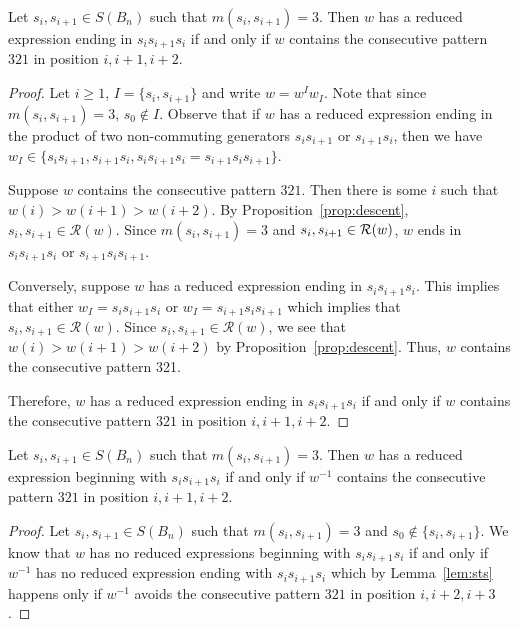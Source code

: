\begin{lemma}\label{lem:sts}
Let $s_i,s_{i+1} \in S(B_n)$ such that $m(s_i,s_{i+1})=3$. Then $w$ has a reduced expression ending in $s_is_{i+1}s_i$ if and only if $w$ contains the consecutive pattern $321$ in position $i, i+1, i+2$.
\begin{proof}
	Let $i \geq 1$, $I=\{s_i,s_{i+1}\}$ and write $w=w^Iw_I$. Note that since $m(s_i,s_{i+1})=3$, $s_0 \notin I$. Observe that if $w$ has a reduced expression ending in the product of two non-commuting generators $s_is_{i+1}$ or $s_{i+1}s_i$, then we have $w_I \in \{s_is_{i+1}, s_{i+1}s_i, s_is_{i+1}s_i=s_{i+1}s_is_{i+1}\}$.
	
	Suppose $w$ contains the consecutive pattern $321$. Then there is some $i$ such that $w(i) > w(i+1) > w(i+2)$. By Proposition~\ref{prop:descent}, $s_i,s_{i+1} \in \mathcal{R}(w)$. Since $m(s_i,s_{i+1})=3$ and $s_i, s_{i+1} \in \mathcal{R}(w)$, $w$ ends in $s_is_{i+1}s_{i}$ or $s_{i+1}s_is_{i+1}$.
	
	Conversely, suppose $w$ has a reduced expression ending in $s_is_{i+1}s_i$. This implies that either $w_I=s_is_{i+1}s_i$ or $w_I=s_{i+1}s_is_{i+1}$ which implies that $s_i,s_{i+1} \in \mathcal{R}(w)$. Since $s_i,s_{i+1} \in \mathcal{R}(w)$, we see that $w(i)>w(i+1)>w(i+2)$ by Proposition~\ref{prop:descent}. Thus, $w$ contains the consecutive pattern 321.
	
	Therefore, $w$ has a reduced expression ending in $s_is_{i+1}s_i$ if and only if $w$ contains the consecutive pattern $321$ in position $i, i+1, i+2$. 
\end{proof}	
\end{lemma}

\begin{corollary}\label{lem:endswithsts}
	Let $s_i,s_{i+1} \in S(B_n)$ such that $m(s_i,s_{i+1})=3$. Then $w$ has a reduced expression beginning with $s_is_{i+1}s_i$ if and only if $w^{-1}$ contains the consecutive pattern $321$ in position $i, i+1, i+2$.
	\begin{proof}
		Let $s_i,s_{i+1} \in S(B_n)$ such that $m(s_i,s_{i+1})=3$ and $s_0 \notin\{s_i,s_{i+1}\}$. We know that $w$ has no reduced expressions beginning with $s_is_{i+1}s_i$ if and only if $w^{-1}$ has no reduced expression ending with $s_is_{i+1}s_i$ which by Lemma~\ref{lem:sts} happens only if $w^{-1}$ avoids the consecutive pattern $321$ in position $i, i+2, i+3$.
	\end{proof}
\end{corollary}

